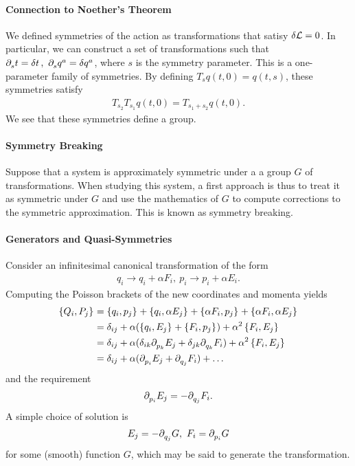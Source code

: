 \paragraph{Connection to Noether's Theorem}
We defined symmetries of the action as transformations that satisy $\var{\ensuremath{\mathcal{L}}} = 0$. In particular, we can construct a set of transformations such that $\partial^{}_{s}t = \var{t},\ \partial^{}_{s}q^{a} = \var{q^{a}}$, where $s$ is the symmetry parameter. This is a one-parameter family of symmetries. By defining $T_{s}q(t, 0) = q(t, s)$, these symmetries satisfy
\begin{align*}
T_{s_{2}}T_{s_{1}}q(t, 0) = T_{s_{1} + s_{2}}q(t, 0).
\end{align*}
We see that these symmetries define a group.


\paragraph{Symmetry Breaking}
Suppose that a system is approximately symmetric under a a group $G$ of transformations. When studying this system, a first approach is thus to treat it as symmetric under $G$ and use the mathematics of $G$ to compute corrections to the symmetric approximation. This is known as symmetry breaking.


\paragraph{Generators and Quasi-Symmetries}
Consider an infinitesimal canonical transformation of the form
\begin{align*}
	q_{i} \to q_{i} + \alpha F_{i},\ p_{i} \to p_{i} + \alpha E_{i}.
\end{align*}
Computing the Poisson brackets of the new coordinates and momenta yields
\begin{align*}
	\left\{Q_{i}, P_{j}\right\}_{} &= \left\{q_{i}, p_{j}\right\}_{} + \left\{q_{i}, \alpha E_{j}\right\}_{} + \left\{\alpha F_{i}, p_{j}\right\}_{} + \left\{\alpha F_{i}, \alpha E_{j}\right\}_{} \\
                       &= \delta_{ij} + \alpha(\left\{q_{i}, E_{j}\right\}_{} + \left\{F_{i}, p_{j}\right\}_{}) + \alpha^{2}\left\{F_{i}, E_{j}\right\}_{} \\
                       &= \delta_{ij} + \alpha(\delta_{ik}\partial^{}_{p_{k}}E_{j} + \delta_{jk}\partial^{}_{q_{k}}F_{i}) + \alpha^{2}\left\{F_{i}, E_{j}\right\}_{} \\
                       &= \delta_{ij} + \alpha(\partial^{}_{p_{i}}E_{j} + \partial^{}_{q_{j}}F_{i}) + \dots
\end{align*}
and the requirement
\begin{align*}
	\partial^{}_{p_{i}}E_{j} = -\partial^{}_{q_{j}}F_{i}.
\end{align*}
A simple choice of solution is
\begin{align*}
	E_{j} = -\partial^{}_{q_{j}}G,\ F_{i} = \partial^{}_{p_{i}}G
\end{align*}
for some (smooth) function $G$, which  may be said to generate the transformation.


